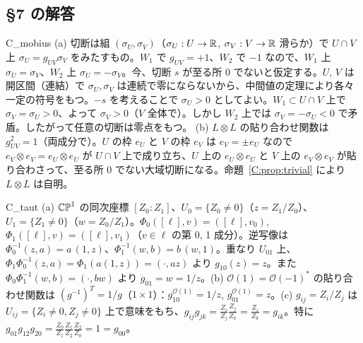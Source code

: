 \subsection*{§7 の解答}
\begin{soll}{C_mobius}
(a) 切断は組 $(\sigma_U,\sigma_V)$（$\sigma_U:U\to\mathbb R$, $\sigma_V:V\to\mathbb R$ 滑らか）で $U\cap V$ 上 $\sigma_U=g_{UV}\sigma_V$ をみたすもの。$W_1$ で $g_{UV}=+1$、$W_2$ で $-1$ なので、$W_1$ 上 $\sigma_U=\sigma_V$、$W_2$ 上 $\sigma_U=-\sigma_V$。今、切断 $s$ が至る所 $0$ でないと仮定する。$U$, $V$ は開区間（連結）で $\sigma_U,\sigma_V$ は連続で零にならないから、中間値の定理により各々一定の符号をもつ。$-s$ を考えることで $\sigma_U>0$ としてよい。$W_1\subset U\cap V$ 上で $\sigma_V=\sigma_U>0$、よって $\sigma_V>0$（$V$ 全体で）。しかし $W_2$ 上では $\sigma_V=-\sigma_U<0$ で矛盾。したがって任意の切断は零点をもつ。
(b) $L\otimes L$ の貼り合わせ関数は $g_{UV}^2=1$（両成分で）。$U$ の枠 $e_U$ と $V$ の枠 $e_V$ は $e_V=\pm e_U$ なので $e_V\otimes e_V=e_U\otimes e_U$ が $U\cap V$ 上で成り立ち、$U$ 上の $e_U\otimes e_U$ と $V$ 上の $e_V\otimes e_V$ が貼り合わさって、至る所 $0$ でない大域切断になる。命題~\ref{C:prop:trivial} により $L\otimes L$ は自明。
\end{soll}

\begin{soll}{C_taut}
(a) $\mathbb{CP}^1$ の同次座標 $[Z_0:Z_1]$、$U_0=\{Z_0\ne0\}$（$z=Z_1/Z_0$）、$U_1=\{Z_1\ne0\}$（$w=Z_0/Z_1$）。$\Phi_0([\ell],v)=([\ell],v_0)$, $\Phi_1([\ell],v)=([\ell],v_1)$（$v\in\ell$ の第 0, 1 成分）。逆写像は $\Phi_0^{-1}(z,a)=a\,(1,z)$、$\Phi_1^{-1}(w,b)=b\,(w,1)$。重なり $U_{01}$ 上、$\Phi_1\Phi_0^{-1}(z,a)=\Phi_1(a(1,z))=(\cdot,az)$ より $g_{10}(z)=z$。また $\Phi_0\Phi_1^{-1}(w,b)=(\cdot,bw)$ より $g_{01}=w=1/z$。(b) $\mathcal O(1)=\mathcal O(-1)^*$ の貼り合わせ関数は $(g^{-1})^T=1/g$（$1\times1$）：$g^{\mathcal O(1)}_{10}=1/z$, $g^{\mathcal O(1)}_{01}=z$。(c) $g_{ij}=Z_i/Z_j$ は $U_{ij}=\{Z_i\ne0,Z_j\ne0\}$ 上で意味をもち、$g_{ij}g_{jk}=\frac{Z_i}{Z_j}\frac{Z_j}{Z_k}=\frac{Z_i}{Z_k}=g_{ik}$。特に $g_{01}g_{12}g_{20}=\frac{Z_0}{Z_1}\frac{Z_1}{Z_2}\frac{Z_2}{Z_0}=1=g_{00}$。
\end{soll}


